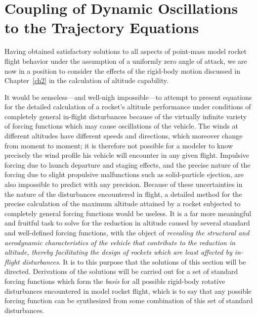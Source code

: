 \section{Coupling of Dynamic Oscillations to the Trajectory Equations}\label{ch4:sec:4}

Having obtained satisfactory solutions to all aspects of point-mass model rocket flight behavior
under the assumption of a uniformly zero angle of attack, we are now in a position to consider the
effects of the rigid-body motion discussed in Chapter~\ref{ch2} in the calculation of altitude
capability.

It would be senseless---and well-nigh impossible---to attempt to present equations for the
detailed calculation of a rocket's altitude performance under conditions of completely general
in-flight disturbances because of the virtually infinite variety of forcing functions which may
cause oscillations of the vehicle. The winds at different altitudes have different speeds and
directions, which moreover change from moment to moment; it is therefore not possible for a
modeler to know precisely the wind profile his vehicle will encounter in any given flight.
Impulsive forcing due to launch departure and staging effects, and the precise nature of the
forcing due to slight propulsive malfunctions such as solid-particle ejection, are also impossible
to predict with any precision. Because of these uncertainties in the nature of the disturbances
encountered in flight, a detailed method for the precise calculation of the maximum altitude
attained by a rocket subjected to completely general forcing functions would be useless. It is a
far more meaningful and fruitful task to solve for the reduction in altitude caused by several
standard and well-defined forcing functions, with the object of \emph{revealing the structural and
aerodynamic characteristics of the vehicle that contribute to the reduction in altitude, thereby
facilitating the design of rockets which are least affected by in-flight disturbances}. It is to
this purpose that the solutions of this section will be directed. Derivations of the solutions
will be carried out for a set of standard forcing functions which form the \emph{basis} for all
possible rigid-body rotative disturbances encountered in model rocket flight, which is to say that
any possible forcing function can be synthesized from some combination of this set of standard
disturbances.

